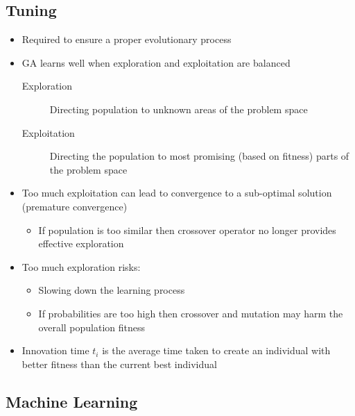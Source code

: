 \documentclass[a4paper]{article}
\begin{document}
\subsection{Tuning}

\begin{itemize}
  \item Required to ensure a proper evolutionary process
  \item GA learns well when exploration and exploitation are balanced
    \begin{description}
      \item[Exploration]
        Directing population to unknown areas of the problem space
      \item[Exploitation]
        Directing the population to most promising (based on fitness) parts of
        the problem space
    \end{description}
  \item Too much exploitation can lead to convergence to a sub-optimal solution
        (premature convergence)
    \begin{itemize}
      \item If population is too similar then crossover operator no longer
            provides effective exploration
    \end{itemize}
  \item Too much exploration risks:
    \begin{itemize}
      \item Slowing down the learning process
      \item If probabilities are too high then crossover and mutation may harm
            the overall population fitness
    \end{itemize}
  \item Innovation time $t_{i}$ is the average time taken to create an
        individual with better fitness than the current best individual
\end{itemize}

\subsection{Machine Learning}
\end{document}
